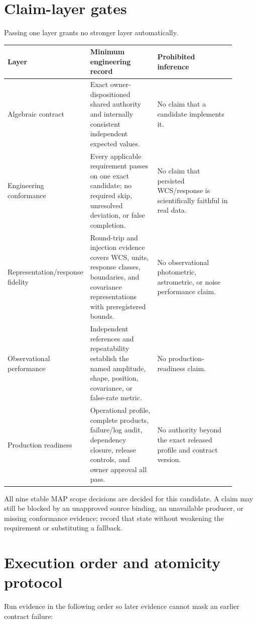\documentclass[10pt]{article}
\begin{document}
\clearpage
\section{Claim-layer gates}

Passing one layer grants no stronger layer automatically.

\begin{longtable}{L{0.22\linewidth}L{0.31\linewidth}L{0.37\linewidth}}
\toprule
Layer & Minimum engineering record & Prohibited inference\\
\midrule
Algebraic contract & Exact owner-dispositioned shared authority and internally consistent
independent expected values. & No claim that a candidate implements it.\\
Engineering conformance & Every applicable requirement passes on one exact
candidate; no required skip, unresolved deviation, or false completion. & No
claim that persisted WCS/response is scientifically faithful in real data.\\
Representation/response fidelity & Round-trip and injection evidence covers
WCS, units, response classes, boundaries, and covariance representations with
preregistered bounds. & No observational photometric, astrometric, or noise
performance claim.\\
Observational performance & Independent references and repeatability establish
the named amplitude, shape, position, covariance, or false-rate metric. & No
production-readiness claim.\\
Production readiness & Operational profile, complete products, failure/log
audit, dependency closure, release controls, and owner approval all pass. & No
authority beyond the exact released profile and contract version.\\
\bottomrule
\end{longtable}

All nine stable MAP scope decisions are decided for this candidate.  A claim
may still be blocked by an unapproved source binding, an unavailable producer,
or missing conformance evidence; record that state without weakening the
requirement or substituting a fallback.

\section{Execution order and atomicity protocol}

Run evidence in the following order so later evidence cannot mask an earlier
contract failure:
\end{document}
